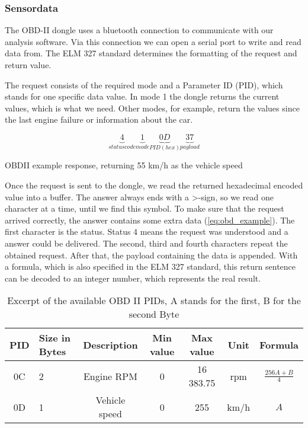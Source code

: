 \subsubsection{Sensordata}
The OBD-II dongle uses a bluetooth connection to communicate with our analysis software. Via this connection we can open a serial port to write and read data from.
The ELM 327 standard determines the formatting of the request and return value.

The request consists of the required mode and a Parameter ID (PID), which stands for one specific data value. In mode 1 the dongle returns the current values, which is what we need. Other modes, for example, return the values since the last engine failure or information about the car.

\begin{equation}
	\label{eq:obd_example}
		\underbrace{4}_{status code}
		\underbrace{1}_{mode}
		\underbrace{0D}_{PID (hex)}
		\underbrace{37}_{payload}
\end{equation}
\begin{center}
	OBDII example response, returning 55 km/h as the vehicle speed
\end{center}

Once the request is sent to the dongle, we read the returned hexadecimal encoded value into a buffer. The answer always ends with a >-sign, so we read one character at a time, until we find this symbol. To make sure that the request arrived correctly, the answer contains some extra data (\ref{eq:obd_example}). The first character is the status. Status 4 means the request was understood and a answer could be delivered. The second, third and fourth characters repeat the obtained request. After that, the payload containing the data is appended. With a formula, which is also specified in the ELM 327 standard, this return sentence can be decoded to an integer number, which represents the real result.

\begin{table}[!ht]
	\begin{center}
		\begin{tabularx}{\textwidth}{|c | X | c | c | c | c | c |}
			\hline
			PID & Size in Bytes & Description & Min value & Max value & Unit & Formula\\ \hline
			0C & 2 & Engine RPM & 0 & 16 383.75 & rpm & $\frac{256A + B}{4}$\\ \hline
			0D & 1 & Vehicle speed & 0 & 255 & km/h & $A$\\ \hline
		\end{tabularx}
	\end{center}
	\caption{Excerpt of the available OBD II PIDs, A stands for the first, B for the second Byte}
\end{table}

